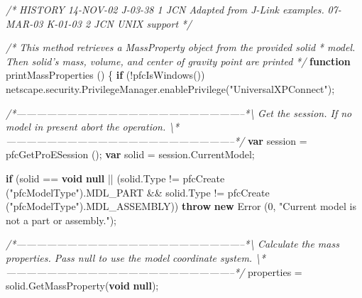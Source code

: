 \documentclass[]{article}
\newenvironment{Shaded}{}{}
\newcommand{\KeywordTok}[1]{\textcolor[rgb]{0.00,0.44,0.13}{\textbf{{#1}}}}
\newcommand{\DecValTok}[1]{\textcolor[rgb]{0.25,0.63,0.44}{{#1}}}
\newcommand{\StringTok}[1]{\textcolor[rgb]{0.25,0.44,0.63}{{#1}}}
\newcommand{\CommentTok}[1]{\textcolor[rgb]{0.38,0.63,0.69}{\textit{{#1}}}}
\newcommand{\OtherTok}[1]{\textcolor[rgb]{0.00,0.44,0.13}{{#1}}}
\newcommand{\FunctionTok}[1]{\textcolor[rgb]{0.02,0.16,0.49}{{#1}}}
\newcommand{\NormalTok}[1]{{#1}}
\begin{document}
\begin{Shaded}
\begin{Highlighting}[]
\CommentTok{/*}
\CommentTok{   HISTORY}
\CommentTok{   }
\CommentTok{14-NOV-02   J-03-38   $$1   JCN      Adapted from J-Link examples.}
\CommentTok{07-MAR-03   K-01-03   $$2   JCN      UNIX support}
\CommentTok{*/}

\CommentTok{/* This method retrieves a MassProperty object from the provided solid}
\CommentTok{ * model. Then solid's mass, volume, and center of gravity point are printed}
\CommentTok{ */}
\KeywordTok{function} \FunctionTok{printMassProperties} \NormalTok{()}
\NormalTok{\{}
  \KeywordTok{if} \NormalTok{(!}\FunctionTok{pfcIsWindows}\NormalTok{())}
    \OtherTok{netscape}\NormalTok{.}\OtherTok{security}\NormalTok{.}\OtherTok{PrivilegeManager}\NormalTok{.}\FunctionTok{enablePrivilege}\NormalTok{(}\StringTok{"UniversalXPConnect"}\NormalTok{);}
  
\CommentTok{/*--------------------------------------------------------------------*\textbackslash{} }
\CommentTok{  Get the session. If no model in present abort the operation. }
\CommentTok{\textbackslash{}*--------------------------------------------------------------------*/}  
  \KeywordTok{var} \NormalTok{session = }\FunctionTok{pfcGetProESession} \NormalTok{();}
  \KeywordTok{var} \NormalTok{solid = }\OtherTok{session}\NormalTok{.}\FunctionTok{CurrentModel}\NormalTok{;}
  
  \KeywordTok{if} \NormalTok{(solid == }\KeywordTok{void} \KeywordTok{null} \NormalTok{|| (}\OtherTok{solid}\NormalTok{.}\FunctionTok{Type} \NormalTok{!= }\FunctionTok{pfcCreate} \NormalTok{(}\StringTok{"pfcModelType"}\NormalTok{).}\FunctionTok{MDL_PART} \NormalTok{&&}
                 \OtherTok{solid}\NormalTok{.}\FunctionTok{Type} \NormalTok{!= }\FunctionTok{pfcCreate} \NormalTok{(}\StringTok{"pfcModelType"}\NormalTok{).}\FunctionTok{MDL_ASSEMBLY}\NormalTok{))}
    \KeywordTok{throw} \KeywordTok{new} \FunctionTok{Error} \NormalTok{(}\DecValTok{0}\NormalTok{, }\StringTok{"Current model is not a part or assembly."}\NormalTok{);}
  
\CommentTok{/*--------------------------------------------------------------------*\textbackslash{} }
\CommentTok{  Calculate the mass properties.  Pass null to use the model }
\CommentTok{    coordinate system.}
\CommentTok{\textbackslash{}*--------------------------------------------------------------------*/}  
  \NormalTok{properties = }\OtherTok{solid}\NormalTok{.}\FunctionTok{GetMassProperty}\NormalTok{(}\KeywordTok{void} \KeywordTok{null}\NormalTok{);}
  

\end{Highlighting}
\end{Shaded}
\end{document}
